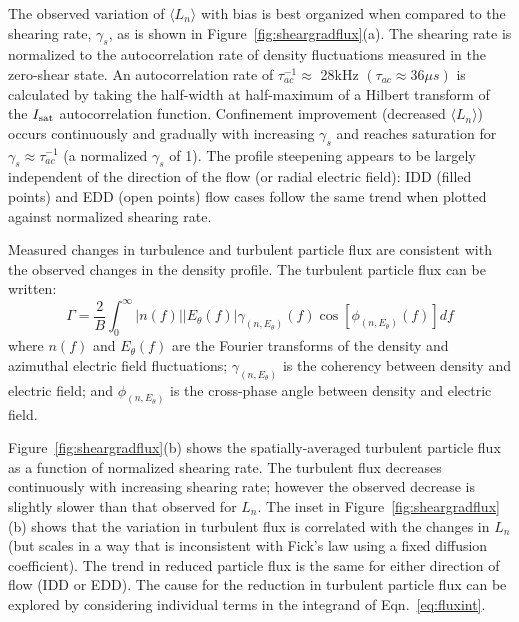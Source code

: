 \documentclass[aip,pop,amsmath,amssymb,reprint,superscriptaddress]{revtex4-1} %
\begin{document}
The observed variation of $\langle L_{n} \rangle$ with bias is best
organized when compared to the shearing rate, $\gamma_{s}$, as is
shown in Figure~\ref{fig:sheargradflux}(a).   The shearing rate is
normalized to the autocorrelation rate of density fluctuations
measured in the zero-shear state.  An autocorrelation rate of $\tau_{ac}^{-1} \approx $ 28kHz $(\tau_{ac} \approx 36\mu s)$ is calculated by taking the half-width at half-maximum of a Hilbert transform of the $I_{\rm sat}$
autocorrelation function.  Confinement improvement (decreased $\langle
L_n \rangle$) occurs continuously and gradually with increasing
$\gamma_{s}$ and reaches saturation for $\gamma_{s} \approx \tau_{ac}^{-1}$ (a normalized $\gamma_{s}$ of 1).  The profile steepening
appears to be largely independent of the direction of the flow (or radial electric field): IDD (filled points) and EDD (open points) flow cases follow the same trend when plotted against normalized shearing rate.

Measured changes in turbulence and turbulent particle flux are
consistent with the observed changes in the density profile.  The
turbulent particle flux can be written\cite{powers74}:
\begin{equation}
\Gamma = \frac{2}{B} \int^{\infty}_{0} \lvert n(f) \rvert \lvert E_{\theta}(f) \rvert \gamma_{(n,E_{\theta})}(f) \cos [\phi_{(n,E_{\theta})}(f)] df
\label{eq:fluxint}
\end{equation}
where $n(f)$ and $E_\theta(f)$ are the Fourier transforms of
the density and azimuthal electric field fluctuations;
$\gamma_{(n,E_\theta)}$ is the coherency between density and electric
field; and $\phi_{(n,E_\theta)}$ is the cross-phase angle between
density and electric field.

Figure~\ref{fig:sheargradflux}(b) shows the spatially-averaged turbulent
particle flux as a function of normalized shearing rate.  The
turbulent flux decreases continuously with increasing shearing rate;
however the observed decrease is slightly slower than that observed
for $L_n$.  The inset in Figure~\ref{fig:sheargradflux}(b) shows that the variation in
turbulent flux is correlated with the changes in $L_n$ (but scales in a way
that is inconsistent with Fick's law using a fixed diffusion coefficient).  The
trend in reduced particle flux is the same for either direction of
flow (IDD or EDD).  The cause for the reduction in turbulent particle
flux can be explored by considering individual terms in the integrand
of Eqn.~\ref{eq:fluxint}.
\end{document}
